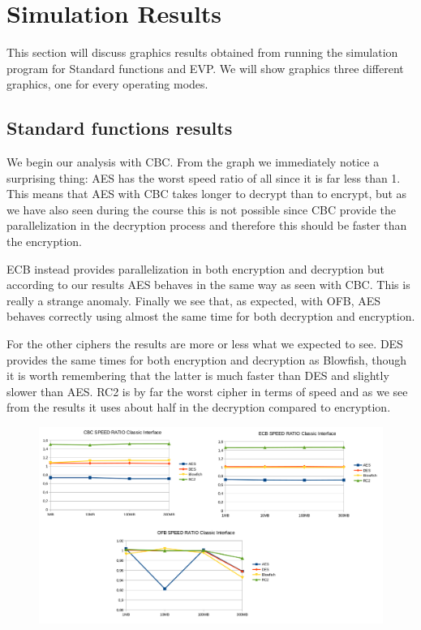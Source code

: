 \documentclass[11pt]{article}
\begin{document}
\newpage
\section{Simulation Results}
This section will discuss graphics results obtained from running the simulation program for Standard functions and EVP. We will show graphics 
three different graphics, one for every operating modes.

\subsection{Standard functions results}
We begin our analysis with CBC. From the graph we immediately notice a surprising thing: AES has the worst speed ratio of all since it is far 
less than 1. This means that AES with CBC takes longer to decrypt than to encrypt, but as we have also seen during the course this 
is not possible since CBC provide the parallelization in the decryption process and therefore this should be faster than the encryption. 

ECB instead provides parallelization in both encryption and decryption but according to our results AES behaves in the same way as seen with CBC. 
This is really a strange anomaly. Finally we see that, as expected, with OFB, AES behaves correctly using almost the same time for both 
decryption and encryption.

For the other ciphers the results are more or less what we expected to see. DES provides the same times for both encryption and decryption 
as Blowfish, though it is worth remembering that the latter is much faster than DES and slightly slower than AES. RC2 is by far the worst cipher 
in terms of speed and as we see from the results it uses about half in the decryption compared to encryption.

\begin{figure}[!ht]
  \includegraphics[width=1\textwidth]{pic2-hw1-1635747}
  \label{fig:Standard functions result}
\end{figure}
\end{document}
